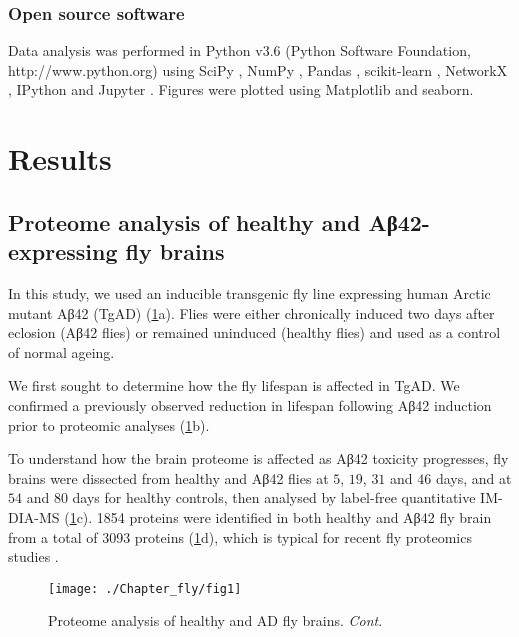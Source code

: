 \subsubsection{Open source software}

Data analysis was performed in Python v3.6 (Python Software Foundation, http://\-www.\-python.org) using SciPy \cite{Oliphant2007}, NumPy \cite{Oliphant2006}, Pandas \cite{McKinney2010}, scikit-learn \cite{Pedregosa2011}, NetworkX \cite{Hagberg2008}, IPython \cite{Perez2007} and Jupyter \cite{Kluyver2016}.
Figures were plotted using Matplotlib \cite{Hunter2007} and seaborn.

\section{Results}
\label{results}

\subsection{Proteome analysis of healthy and Aβ42-expressing fly brains}

In this study, we used an inducible transgenic fly line expressing human Arctic mutant Aβ42 (TgAD) \cite{Crowther2005,Osterwalder2001} (\ref{fig:fly-fig1}a).
Flies were either chronically induced two days after eclosion (Aβ42 flies) or remained uninduced (healthy flies) and used as a control of normal ageing.

We first sought to determine how the fly lifespan is affected in TgAD.
We confirmed a previously observed \cite{Sofola2010} reduction in lifespan following
Aβ42 induction prior to proteomic analyses (\ref{fig:fly-fig1}b).

To understand how the brain proteome is affected as Aβ42 toxicity progresses,
fly brains were dissected from healthy and Aβ42 flies at $5$, $19$, $31$ and $46$ days,
and at $54$ and $80$ days for healthy controls,
then analysed by label-free quantitative IM-DIA-MS (\ref{fig:fly-fig1}c).
\num{1854} proteins were identified in both healthy and Aβ42 fly brain from a total of
\num{3093} proteins (\ref{fig:fly-fig1}d),
which is typical for recent fly proteomics studies \cite{Brown2018,Tain2017}.

\clearpage

\begin{figure}[hp!]
    \centering
    \texttt{[image: ./Chapter\_fly/fig1]}
    \caption{%
        Proteome analysis of healthy and AD fly brains.
        \textit{Cont}.
    }
    \label{fig:fly-fig1}
\end{figure}

